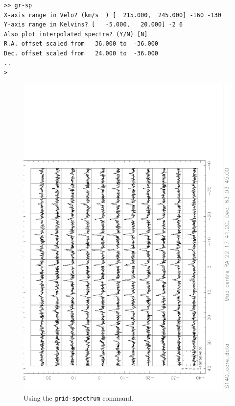 \documentclass[11pt,twoside]{article}
\begin{document}
\begin{verbatim}
>> gr-sp
X-axis range in Velo? (km/s  ) [  215.000,  245.000] -160 -130
Y-axis range in Kelvins? [   -5.000,   20.000] -2 6
Also plot interpolated spectra? (Y/N) [N]
R.A. offset scaled from   36.000 to  -36.000
Dec. offset scaled from   24.000 to  -36.000
..
>
\end{verbatim}

\begin{figure}[htb]
\centering
\includegraphics[angle=-90,width=5in]{sc8_gr_sp.ps}
\vspace*{-0.5cm}
\begin{center}
\begin{minipage}[t]{4.5in}
\caption[`Postage-stamp' (grid) spectrum plot]
{\small{Using the {\tt grid-spectrum} command.}
}
\label{fig:specx_fig6}
\end{minipage}
\end{center}
\end{figure}
\end{document}
